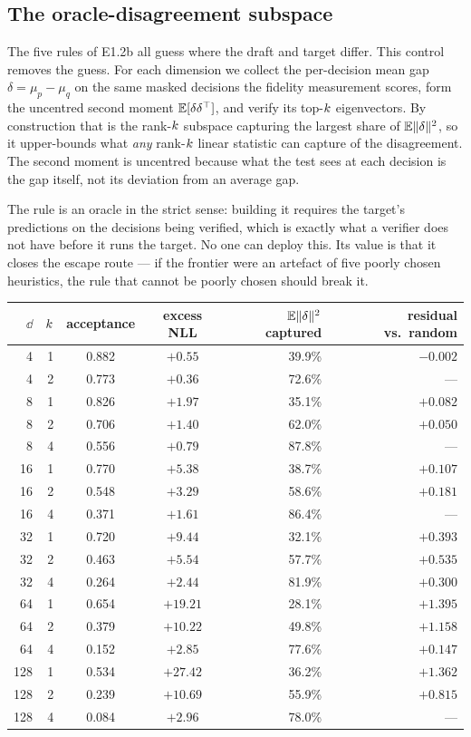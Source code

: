 \subsection{The oracle-disagreement subspace}
\label{app:oracle}

The five rules of E1.2b all guess where the draft and target differ. This control removes the guess.
For each dimension we collect the per-decision mean gap $\delta = \mu_p - \mu_q$ on the same masked
decisions the fidelity measurement scores, form the uncentred second moment
$\mathbb{E}[\delta\delta^\top]$, and verify its top-$k$ eigenvectors. By construction that is the rank-$k$
subspace capturing the largest share of $\mathbb{E}\|\delta\|^2$, so it upper-bounds what \emph{any}
rank-$k$ linear statistic can capture of the disagreement. The second moment is uncentred because
what the test sees at each decision is the gap itself, not its deviation from an average gap.

The rule is an oracle in the strict sense: building it requires the target's predictions on the
decisions being verified, which is exactly what a verifier does not have before it runs the target.
No one can deploy this. Its value is that it closes the escape route --- if the frontier were an
artefact of five poorly chosen heuristics, the rule that cannot be poorly chosen should break it.

\begin{center}
\small
\begin{tabular}{rrccrr}
\toprule
$\dd$ & $k$ & acceptance & excess NLL & $\mathbb{E}\|\delta\|^2$ captured & residual vs.\ random \\
\midrule
4   & 1 & 0.882 & $+0.55$  & 39.9\% & $-0.002$ \\
4   & 2 & 0.773 & $+0.36$  & 72.6\% & --- \\
\midrule
8   & 1 & 0.826 & $+1.97$  & 35.1\% & $+0.082$ \\
8   & 2 & 0.706 & $+1.40$  & 62.0\% & $+0.050$ \\
8   & 4 & 0.556 & $+0.79$  & 87.8\% & --- \\
\midrule
16  & 1 & 0.770 & $+5.38$  & 38.7\% & $+0.107$ \\
16  & 2 & 0.548 & $+3.29$  & 58.6\% & $+0.181$ \\
16  & 4 & 0.371 & $+1.61$  & 86.4\% & --- \\
\midrule
32  & 1 & 0.720 & $+9.44$  & 32.1\% & $+0.393$ \\
32  & 2 & 0.463 & $+5.54$  & 57.7\% & $+0.535$ \\
32  & 4 & 0.264 & $+2.44$  & 81.9\% & $+0.300$ \\
\midrule
64  & 1 & 0.654 & $+19.21$ & 28.1\% & $+1.395$ \\
64  & 2 & 0.379 & $+10.22$ & 49.8\% & $+1.158$ \\
64  & 4 & 0.152 & $+2.85$  & 77.6\% & $+0.147$ \\
\midrule
128 & 1 & 0.534 & $+27.42$ & 36.2\% & $+1.362$ \\
128 & 2 & 0.239 & $+10.69$ & 55.9\% & $+0.815$ \\
128 & 4 & 0.084 & $+2.96$  & 78.0\% & --- \\
\bottomrule
\end{tabular}
\end{center}

